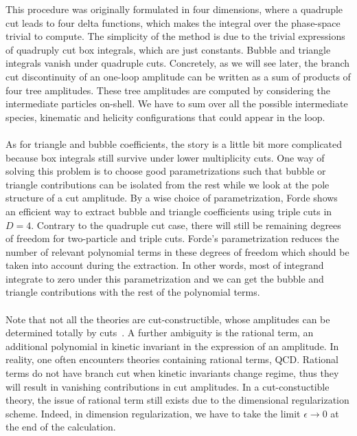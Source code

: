 This procedure was originally formulated in four dimensions, where a quadruple cut leads to four delta functions, which makes the integral over the phase-space trivial to compute. 
The simplicity of the method is due to the trivial expressions of quadruply cut box integrals, which are just constants.
Bubble and triangle integrals vanish under quadruple cuts.
Concretely, as we will see later, the branch cut discontinuity of an one-loop amplitude can be written as a sum of products of four tree amplitudes.
These tree amplitudes are computed by considering the intermediate particles on-shell.
We have to sum over all the possible intermediate species, kinematic and helicity configurations that could appear in the loop.
\\\\
As for triangle and bubble coefficients, the story is a little bit more complicated because box integrals still survive under lower multiplicity cuts.
One way of solving this problem is to choose good parametrizations such that bubble or triangle contributions can be isolated from the rest while we look at the pole structure of a cut amplitude.
By a wise choice of parametrization, Forde shows~\cite{Forde:2007mi} an efficient way to extract bubble and triangle coefficients using triple cuts in $D=4$.
Contrary to the quadruple cut case, there will still be remaining degrees of freedom for two-particle and triple cuts. 
Forde's parametrization reduces the number of relevant polynomial terms in these degrees of freedom which should be taken into account during the extraction. 
In other words, most of integrand integrate to zero under this parametrization and we can get the bubble and triangle contributions with the rest of the polynomial terms.
\\\\
Note that not all the theories are cut-constructible, \ie whose amplitudes can be determined totally by cuts~\cite{Bern:1994cg}. 
A further ambiguity is the rational term, \ie an additional polynomial in kinetic invariant in the expression of an amplitude. 
In reality, one often encounters theories containing rational terms, \ie QCD.
Rational terms do not have branch cut when kinetic invariants change regime, thus they will result in vanishing contributions in cut amplitudes.
In a cut-constuctible theory, the issue of rational term still exists due to the dimensional regularization scheme. 
Indeed, in dimension regularization, we have to take the limit $\epsilon\rightarrow 0$ at the end of the calculation. 

